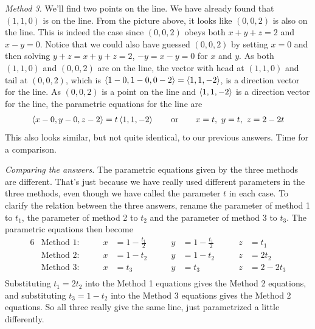 \begin{eg}
\smallskip
\noindent\emph{Method 3.} We'll find two points on the line. We
have already found that $(1,1,0)$ is on the line. From the picture above,
it looks like $(0,0,2)$ is also on the line. This is indeed the case
since $(0,0,2)$ obeys both $x+y+z=2$ and $x-y=0$. Notice that we could also have
guessed $(0,0,2)$ by setting $x=0$  and then solving $y+z=x+y+z=2$, $-y=x-y=0$
for $x$ and $y$. As both $(1,1,0)$
and $(0,0,2)$ are on the line, the vector with head at $(1,1,0)$ and tail
at $(0,0,2)$, which is $\left< 1-0,1-0,0-2\right> =\left< 1,1,-2\right> $, is a direction vector for the 
line. As $(0,0,2)$ is a point on the line and $\left< 1,1,-2\right> $ is a direction
vector for the line, the parametric equations for the line are
\begin{align*}
\left< x-0,y-0,z-2\right> =t\left< 1,1,-2\right> \qquad\text{or}\qquad
x=t,\ y=t,\ z=2-2t
\end{align*}
This also looks similar, but not quite identical, to our previous answers.
Time for a comparison.

\smallskip
\noindent\emph{Comparing the answers.}
The parametric equations given by the three methods are different. That's
just because we have really used different parameters in the three methods,
even though we have called the parameter $t$ in each case. 
To clarify the relation
between the three answers, rename the parameter of method 1 to $t_1$,
the parameter of method 2 to $t_2$ and the parameter of method 3 to $t_3$.
The parametric equations then become
\begin{alignat*}{6}
&\text{Method 1:}\qquad &
   x&=1-\frac{t_1}{2}\qquad &
   y&=1-\frac{t_1}{2}\qquad & 
   z&=t_1 \\
&\text{Method 2:}\qquad &
   x&=1-t_2\qquad &
   y&=1-t_2\qquad & 
   z&=2t_2 \\
&\text{Method 3:}\qquad &
   x&=t_3\qquad &
   y&=t_3\qquad & 
   z&=2-2t_3 \\
\end{alignat*}  
Substituting $t_1=2t_2$ into the Method 1 equations gives the Method 2
equations, and substituting $t_3=1-t_2$ into the Method 3 equations gives 
the Method 2 equations. So all three really give the same line, just parametrized a little differently.

\end{eg}

